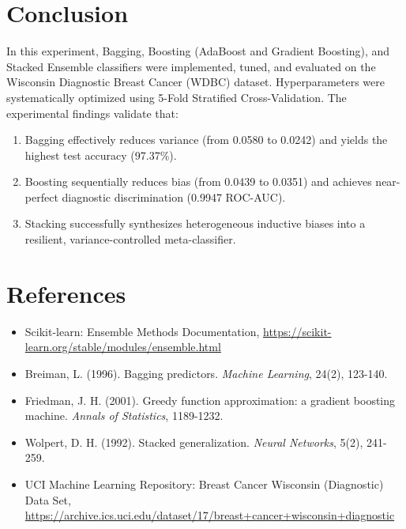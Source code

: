 \documentclass[12pt,a4paper]{article}
\begin{document}
\section{Conclusion}
In this experiment, Bagging, Boosting (AdaBoost and Gradient Boosting), and Stacked Ensemble classifiers were implemented, tuned, and evaluated on the Wisconsin Diagnostic Breast Cancer (WDBC) dataset. Hyperparameters were systematically optimized using 5-Fold Stratified Cross-Validation. The experimental findings validate that:
\begin{enumerate}
\item Bagging effectively reduces variance (from 0.0580 to 0.0242) and yields the highest test accuracy (97.37\%).
\item Boosting sequentially reduces bias (from 0.0439 to 0.0351) and achieves near-perfect diagnostic discrimination (0.9947 ROC-AUC).
\item Stacking successfully synthesizes heterogeneous inductive biases into a resilient, variance-controlled meta-classifier.
\end{enumerate}

\section{References}
\begin{itemize}
\item Scikit-learn: Ensemble Methods Documentation, \url{https://scikit-learn.org/stable/modules/ensemble.html}
\item Breiman, L. (1996). Bagging predictors. \textit{Machine Learning}, 24(2), 123-140.
\item Friedman, J. H. (2001). Greedy function approximation: a gradient boosting machine. \textit{Annals of Statistics}, 1189-1232.
\item Wolpert, D. H. (1992). Stacked generalization. \textit{Neural Networks}, 5(2), 241-259.
\item UCI Machine Learning Repository: Breast Cancer Wisconsin (Diagnostic) Data Set, \url{https://archive.ics.uci.edu/dataset/17/breast+cancer+wisconsin+diagnostic}
\end{itemize}
\end{document}
